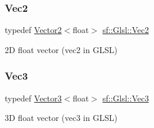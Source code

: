 \subsubsection{\texorpdfstring{Vec2}{Vec2}}
{\footnotesize\ttfamily typedef \mbox{\hyperlink{classsf_1_1_vector2}{Vector2}}$<$float$>$ \mbox{\hyperlink{namespacesf_1_1_glsl_adeed356d346d87634b4c197a530e4edf}{sf\+::\+Glsl\+::\+Vec2}}}



2D float vector ({\ttfamily vec2} in G\+L\+SL) 

\begin{DoxyVerb}\end{DoxyVerb}
 \mbox{\label{namespacesf_1_1_glsl_a9bdd0463b7cb5316244a082007bd50f0}} 
\subsubsection{\texorpdfstring{Vec3}{Vec3}}
{\footnotesize\ttfamily typedef \mbox{\hyperlink{classsf_1_1_vector3}{Vector3}}$<$float$>$ \mbox{\hyperlink{namespacesf_1_1_glsl_a9bdd0463b7cb5316244a082007bd50f0}{sf\+::\+Glsl\+::\+Vec3}}}



3D float vector ({\ttfamily vec3} in G\+L\+SL) 

\begin{DoxyVerb}\end{DoxyVerb}
 